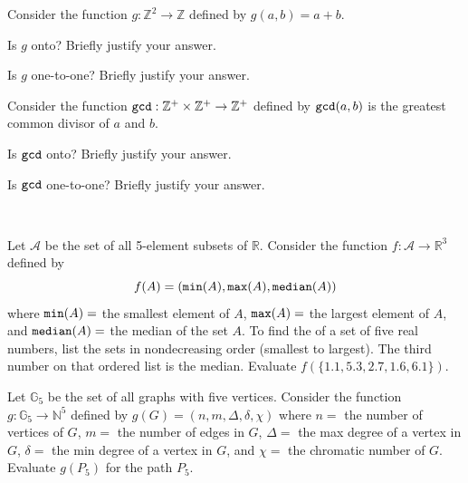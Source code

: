 \begin{exer}[\exerU] %
\label{exer_addition_onetoone_onto}
    Consider the function $g: \mathbb{Z}^2 \to \mathbb{Z}$ defined by $g(a,b) = a+b$.  
        \begin{apart}
            \item Is $g$ onto? Briefly justify your answer. 
            \item Is $g$ one-to-one? Briefly justify your answer.
        \end{apart}  
\end{exer}

\begin{exer}[\exerU] %
\label{exer_gcd_onetoone_onto}
    Consider the function $\texttt{gcd}: \mathbb{Z}^+ \times \mathbb{Z}^+ \to \mathbb{Z}^+$ defined by $\texttt{gcd}(a,b)$ is the greatest common divisor of $a$ and $b$.  
        \begin{apart}
            \item Is $\texttt{gcd}$ onto? Briefly justify your answer. 
            \item Is $\texttt{gcd}$ one-to-one? Briefly justify your answer.
        \end{apart}  
\end{exer}

\begin{exer}[\exerU] %
\label{exer_data_fn_graphs_sets}
~
    \begin{exerpart}
        \item Let $\mathscr{A}$ be the set of all 5-element subsets of $\mathbb{R}$.  Consider the function $f: \mathscr{A} \to \mathbb{R}^3$ defined by $$f(A) = (\texttt{min}(A), \texttt{max}(A), \texttt{median}(A))$$
        where $\texttt{min}(A)=$ the smallest element of $A$, $\texttt{max}(A)=$ the largest element of $A$, and $\texttt{median}(A) =$ the median of the set $A$. To find the  of a set of five real numbers, list the sets in nondecreasing order (smallest to largest).  The third number on that ordered list is the median. Evaluate $f(\{1.1, 5.3, 2.7, 1.6, 6.1\})$.
        \item Let $\mathbb{G}_5$ be the set of all graphs with five vertices.  Consider the function $g: \mathbb{G}_5 \to \mathbb{N}^5$ defined by $g(G) = (n,m,\Delta,\delta,\chi)$ where $n=$ the number of vertices of $G$, $m=$ the number of edges in $G$, $\Delta=$ the max degree of a vertex in $G$, $\delta=$ the min degree of a vertex in $G$, and $\chi=$ the chromatic number of $G$. Evaluate $g(P_5)$ for the path $P_5$.
    \end{exerpart}
\end{exer}

